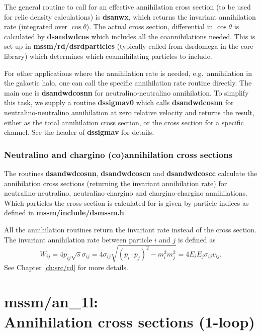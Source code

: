 \documentclass[a4paper,10pt,oneside]{book}
\newcommand{\code}[1]{\ft{#1}}
\newcommand{\codeb}[1]{\ftb{#1}}
\newcommand{\ft}[1]{\textsf{#1}}
\newcommand{\ftb}[1]{{\bfseries \sffamily #1}}
\begin{document}
The general routine to call for an effective annihilation cross section (to
be used for relic density calculations) is \codeb{dsanwx}, which returns the
invariant annihilation rate (integrated over $\cos \theta$). The actual
cross section, differential in $\cos \theta$ is calculated by 
\codeb{dsandwdcos} which includes all the coannihilations needed. This is set
up in \codeb{mssm/rd/dsrdparticles} (typically called from \code{dsrdomega} in 
the \code{core} library) which determines which coannihilating particles
to include.

For other applications where the annihilation rate is needed, e.g.\ annihilation
in the galactic halo, one can call the specific annihilation rate routine
directly. The main one is \codeb{dsandwdcosnn} for neutralino-neutralino
annihilation. To simplify this task, we supply a routine \codeb{dssigmav0} which
calls \codeb{dsandwdcosnn} for neutralino-neutralino annihilation at zero
relative velocity and returns the result, either as the total annihilation
cross section, or the cross section for a specific channel. See the header of
\codeb{dssigmav} for details.

\subsubsection{Neutralino and chargino (co)annihilation cross sections}
                                   
The routines \codeb{dsandwdcosnn}, \codeb{dsandwdcoscn} and \codeb{dsandwdcoscc}
calculate the annihilation cross sections (returning the invariant 
annihilation rate) for neutralino-neutralino, neutralino-chargino and
chargino-chargino annihilations. Which particles the cross section is
calculated for is given by particle indices as defined in \codeb{mssm/include/dsmssm.h}.

All the annihilation routines return the invariant rate instead of the
cross section. The invariant annihilation rate between particle $i$
and $j$ is defined as 
\begin{equation}
  W_{ij} = 4 p_{ij} \sqrt{s} \sigma_{ij} = 4 \sigma_{ij} \sqrt{(p_i
\cdot p_j)^2 - m_i^2 m_j^2} = 4 E_{i} E_{j} \sigma_{ij} v_{ij} .
\end{equation}
See Chapter \ref{ch:src/rd} for more details.

\section[mssm/an\_1l: Annihilation cross sections (1-loop)]{\codeb{mssm/an\_1l}:\\ Annihilation cross sections (1-loop)}
\label{sec:src_models/mssm/an_1l}
\end{document}

